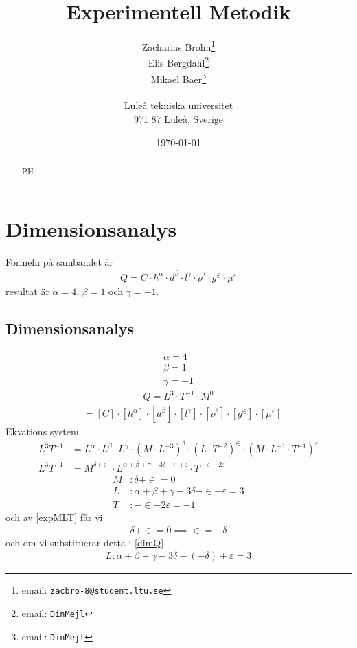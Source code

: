 \documentclass[a4paper,12pt]{article}
\title{Experimentell Metodik}
\author{Zacharias Brohn\thanks{email: \texttt{zacbro-8@student.ltu.se}}\\  
        Elis Bergdahl\thanks{email: \texttt{DinMejl}} \\
        Mikael Baer\thanks{email: \texttt{DinMejl}} \\
        ~ \\
        Luleå tekniska universitet \\ 
        971 87 Luleå, Sverige}
\date{\today}
\begin{document}
%
\begin{abstract}
    PH
\end{abstract}
%
\section{Dimensionsanalys}
Formeln på sambandet är
\begin{align}
    Q = C \cdot h^\alpha \cdot d^\beta \cdot l^\gamma \cdot \rho^\delta \cdot g^\in \cdot \mu^\varepsilon
\end{align}
resultat är $\alpha = 4$, $\beta = 1$ och $\gamma = -1$.
%
\subsection{Dimensionsanalys}
\begin{align}
    \alpha = 4 \\
    \beta = 1 \\
    \gamma = -1
\end{align}
\begin{align}\label{dimQ}
    Q = L^3 \cdot T^{-1} \cdot M^0
\end{align}
\begin{align}
    [Q] &= [C] \cdot [h^\alpha] \cdot [d^\beta] \cdot [l^\gamma] \cdot [\rho^\delta] \cdot [g^\in] \cdot [\mu^\varepsilon]
\end{align}
Ekvations system
\begin{align}
    L^3T^{-1} &= L^{\alpha} \cdot L^{\beta} \cdot L^{\gamma} \cdot (M \cdot L^{-3})^{\delta} \cdot (L \cdot T^{-2})^{\in} \cdot (M \cdot L^{-1} \cdot T^{-1})^{\varepsilon} \\
    L^3T^{-1} &= M^{\delta + \in} \cdot L^{\alpha + \beta + \gamma - 3\delta - \in + \varepsilon} \cdot T^{-\in - 2\varepsilon}
\end{align}
\begin{align}\label{expMLT}
    M&: \delta + \in = 0 \\
    L&: \alpha + \beta + \gamma - 3\delta - \in + \varepsilon = 3 \\
    T&: -\in - 2\varepsilon = -1
\end{align}
och av \ref{expMLT} får vi
\begin{align}
    \delta + \in = 0 \implies \in = - \delta
\end{align}
och om vi substituerar detta i \ref{dimQ}
\begin{align}
    L: \alpha + \beta + \gamma - 3\delta - (-\delta) + \varepsilon = 3
\end{align}
\end{document}
